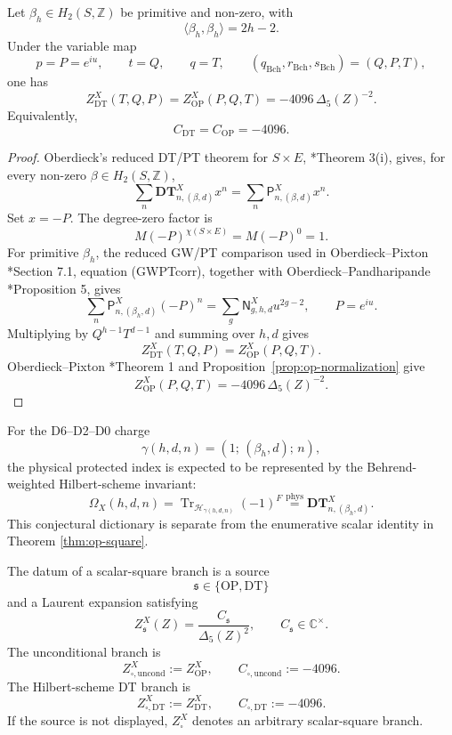 \documentclass[11pt]{memoir}
\newcommand{\Z}{\mathbb{Z}} \newcommand{\C}{\mathbb{C}}
\begin{document}
\begin{theorem}
\label{thm:op-square}
Let \(\beta_h\in H_2(S,\Z)\) be primitive and non-zero, with
$$\langle\beta_h,\beta_h\rangle=2h-2.$$
Under the variable map
$$
p=P=e^{iu},\qquad t=Q,\qquad q=T,\qquad
(q_{\mathrm{Bch}},r_{\mathrm{Bch}},s_{\mathrm{Bch}})=(Q,P,T),
$$
one has
$$
Z^X_{\mathrm{DT}}(T,Q,P)
=Z^X_{\mathrm{OP}}(P,Q,T)
=-4096\,\Delta_5(Z)^{-2}.
$$
Equivalently,
$$C_{\mathrm{DT}}=C_{\mathrm{OP}}=-4096.$$
\end{theorem}

\begin{proof}
Oberdieck's reduced DT/PT theorem for \(S\times E\),
\cite{OberdieckReducedPT}*{Theorem 3(i)}, gives, for every non-zero
\(\beta\in H_2(S,\Z)\),
$$
\sum_n\mathbf{DT}^X_{n,(\beta,d)}x^n
=
\sum_n\mathsf P^X_{n,(\beta,d)}x^n.
$$
Set \(x=-P\).  The degree-zero factor is
$$M(-P)^{\chi(S\times E)}=M(-P)^0=1.$$
For primitive \(\beta_h\), the reduced GW/PT comparison used in
Oberdieck--Pixton \cite{OB}*{Section 7.1, equation (GWPTcorr)},
together with Oberdieck--Pandharipande
\cite{OPand}*{Proposition 5}, gives
$$
\sum_n\mathsf P^X_{n,(\beta_h,d)}(-P)^n
=
\sum_g\mathsf N^X_{g,h,d}u^{2g-2},\qquad P=e^{iu}.
$$
Multiplying by \(Q^{h-1}T^{d-1}\) and summing over \(h,d\) gives
$$Z^X_{\mathrm{DT}}(T,Q,P)=Z^X_{\mathrm{OP}}(P,Q,T).$$
Oberdieck--Pixton \cite{OB}*{Theorem 1} and
Proposition~\ref{prop:op-normalization} give
$$Z^X_{\mathrm{OP}}(P,Q,T)=-4096\,\Delta_5(Z)^{-2}.$$
\end{proof}

\begin{conjecture}
For the D6--D2--D0 charge
$$\gamma(h,d,n)=(1;\,(\beta_h,d);\,n),$$
the physical protected index is expected to be represented by the
Behrend-weighted Hilbert-scheme invariant:
$$
\Omega_X(h,d,n)
=\operatorname{Tr}_{\mathcal H_{\gamma(h,d,n)}}(-1)^F
\stackrel{\mathrm{phys}}{=}
\mathbf{DT}^X_{n,(\beta_h,d)}.
$$
This conjectural dictionary is separate from the enumerative scalar
identity in Theorem \ref{thm:op-square}.
\end{conjecture}

\begin{definition}
The datum of a scalar-square branch is a source
$$\mathfrak s\in\{\mathrm{OP},\mathrm{DT}\}$$
and a Laurent expansion satisfying
$$Z^X_{\mathfrak s}(Z)=\frac{C_{\mathfrak s}}{\Delta_5(Z)^2},
\qquad C_{\mathfrak s}\in\C^\times.$$
The unconditional branch is
$$Z^X_{\square,\mathrm{uncond}}:=Z^X_{\mathrm{OP}},\qquad
C_{\square,\mathrm{uncond}}:=-4096.$$
The Hilbert-scheme DT branch is
$$Z^X_{\square,\mathrm{DT}}:=Z^X_{\mathrm{DT}},\qquad
C_{\square,\mathrm{DT}}:=-4096.$$
If the source is not displayed, $Z^X_{\square}$ denotes an arbitrary
scalar-square branch.
\end{definition}
\end{document}
